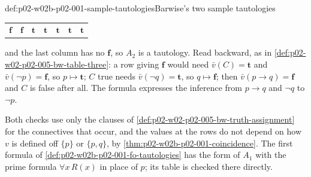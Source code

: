 \begin{hbexample}{def:p02-w02b-p02-001-sample-tautologies}{Barwise's two sample tautologies}
\begin{enumerate}
\begin{center}
\begin{tabular}{cc|ccccc}
      \(\mathbf f\) & \(\mathbf f\) & \(\mathbf t\) & \(\mathbf t\) & \(\mathbf t\) & \(\mathbf t\) & \(\mathbf t\)
      \end{tabular}
      \end{center}
      and the last column has no \(\mathbf f\), so \(A_2\) is a tautology.
      Read backward, as in \cref{def:p02-w02-p02-005-bw-table-three}: a
      row giving \(\mathbf f\) would need \(\bar v(C)=\mathbf t\) and
      \(\bar v(\neg p)=\mathbf f\), so \(p\mapsto\mathbf t\); \(C\) true
      needs \(\bar v(\neg q)=\mathbf t\), so \(q\mapsto\mathbf f\); then
      \(\bar v(p\to q)=\mathbf f\) and \(C\) is false after all.  The
      formula expresses the inference from \(p\to q\) and \(\neg q\) to
      \(\neg p\).
\end{enumerate}
Both checks use only the clauses of
\cref{def:p02-w02-p02-005-bw-truth-assignment} for the connectives that
occur, and the values at the rows do not depend on how \(v\) is defined
off \(\{p\}\) or \(\{p,q\}\), by \cref{thm:p02-w02b-p02-001-coincidence}.
The first formula of \cref{def:p02-w02b-p02-001-fo-tautologies} has the
form of \(A_1\) with the prime formula \(\forall x\,R(x)\) in place of
\(p\); its table is checked there directly.
\end{hbexample}

